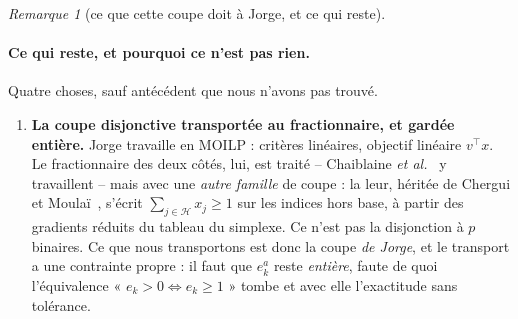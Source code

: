 \documentclass[11pt,a4paper]{article}
\theoremstyle{plain}
\theoremstyle{remark}
\newtheorem{remark}{Remarque}
\begin{document}
\begin{remark}[ce que cette coupe doit à Jorge, et ce qui reste]
\paragraph{Ce qui reste, et pourquoi ce n'est pas rien.} Quatre choses,
sauf antécédent que nous n'avons pas trouvé.
\begin{enumerate}[label=(\alph*),leftmargin=2.2em]
\item \textbf{La coupe disjonctive transportée au fractionnaire, et
  gardée entière.} Jorge travaille en MOILP : critères linéaires, objectif
  linéaire $v^{\top}x$. Le fractionnaire des deux côtés, lui, est traité --
  Chaiblaine \emph{et al.}~\cite{chaiblaine2020} y travaillent -- mais avec
  une \emph{autre famille} de coupe : la leur, héritée de Chergui et
  Moulaï~\cite{chergui2008}, s'écrit $\sum_{j\in\mathcal{H}}x_j\ge 1$ sur
  les indices hors base, à partir des gradients réduits du tableau du
  simplexe. Ce n'est pas la disjonction à $p$ binaires. Ce que nous
  transportons est donc la coupe \emph{de Jorge}, et le transport a une
  contrainte propre : il faut que $e^a_k$ reste \emph{entière}, faute de
  quoi l'équivalence « $e_k>0\iff e_k\ge 1$ » tombe et avec elle
  l'exactitude sans tolérance.


\end{enumerate}
\end{remark}
\end{document}
